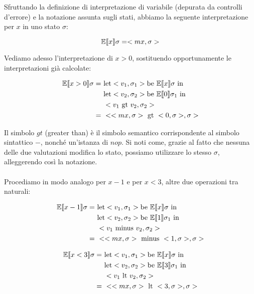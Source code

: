     Sfruttando la definizione di interpretazione di variabile (depurata da controlli d'errore) e la notazione assunta sugli stati, abbiamo la seguente interpretazione per $x$ in uno stato $\sigma$:
    
    \begin{equation*}
        \mathbb{E}\llbracket x \rrbracket\sigma = <mx, \sigma>
    \end{equation*}
    
    Vediamo adesso l'interpretazione di $x>0$, sostituendo opportunamente le interpretazioni già calcolate:
    
    \begin{align*}
        \mathbb{E}\doublebracket{x>0}\sigma =\ & \mbox{let} <v_1,\sigma_1> \mbox{be}\ \mathbb{E}\doublebracket{x}\sigma\ \mbox{in}\\
        &\mbox{let} <v_2,\sigma_2> \mbox{be}\ \mathbb{E}\doublebracket{0}\sigma_1\ \mbox{in}\\
        &<v_1\ \mbox{gt}\ v_2, \sigma_2>\\
        =\ & <<mx,\sigma>\ \mbox{gt}\ <0, \sigma>, \sigma>
    \end{align*}
    
    Il simbolo $gt$ (greater than) è il simbolo semantico corrispondente al simbolo sintattico $-$, nonché un'istanza di $nop$. Si noti come, grazie al fatto che nessuna delle due valutazioni modifica lo stato, possiamo utilizzare lo stesso $\sigma$, alleggerendo così la notazione.\\
    \\
    Procediamo in modo analogo per $x-1$ e per $x<3$, altre due operazioni tra naturali:
    
    \begin{align*}
        \mathbb{E}\doublebracket{x-1}\sigma =\ & \mbox{let} <v_1,\sigma_1> \mbox{be}\ \mathbb{E}\doublebracket{x}\sigma\ \mbox{in}\\
        &\mbox{let} <v_2,\sigma_2> \mbox{be}\  \mathbb{E}\doublebracket{1}\sigma_1\ \mbox{in}\\
        &<v_1\ \mbox{minus}\ v_2, \sigma_2>\\
        =\ & <<mx,\sigma>\ \mbox{minus}\ <1, \sigma>, \sigma>
    \end{align*}
    
    \begin{align*}
        \mathbb{E}\doublebracket{x<3}\sigma =\ & \mbox{let} <v_1,\sigma_1> \mbox{be}\ \mathbb{E}\doublebracket{x}\sigma\ \mbox{in}\\
        &\mbox{let} <v_2,\sigma_2> \mbox{be}\ \mathbb{E}\doublebracket{3}\sigma_1\ \mbox{in}\\
        &<v_1\ \mbox{lt}\ v_2, \sigma_2>\\
        =\ & <<mx,\sigma>\ \mbox{lt}\ <3, \sigma>, \sigma>
    \end{align*}
    
